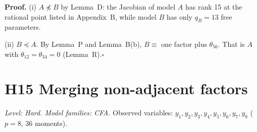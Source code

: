 \documentclass[10pt,a4paper]{article}
\newcommand{\nest}{\preceq}
\newcommand{\nnest}{\not\preceq}
\begin{document}
\noindent\textbf{Proof.} (i) $A\nnest B$ by Lemma~D: the Jacobian of model $A$ has rank 15 at the rational point listed in Appendix~B, while model $B$ has only $q_B=13$ free parameters.\par\smallskip
\noindent(ii) $B\nest A$. By Lemma~P and Lemma~B(b), $B\equiv$ one factor plus $\theta_{56}$. That is $A$ with $\theta_{12}=\theta_{34}=0$ (Lemma~R).\hfill$\square$\par\medskip
{}

\clearpage
\section*{H15 \quad Merging non-adjacent factors}
\noindent\textit{Level: Hard. Model families: CFA.} Observed variables: $y_{1}, y_{2}, y_{3}, y_{4}, y_{5}, y_{6}, y_{7}, y_{8}$ ($p=8$, 36 moments).\par\medskip
\end{document}
